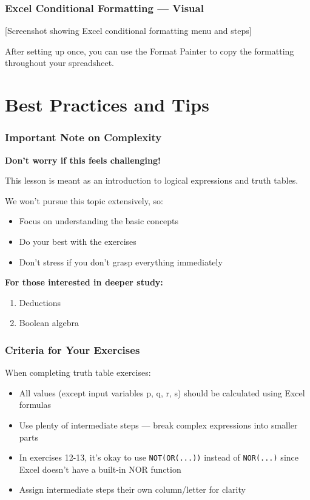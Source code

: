 \documentclass{beamer}
\begin{document}
\begin{frame}
\frametitle{Excel Conditional Formatting --- Visual}
\alert{[Screenshot showing Excel conditional formatting menu and steps]}

\vspace{0.5cm}
After setting up once, you can use the Format Painter to copy the formatting throughout your spreadsheet.
\end{frame}

\section{Best Practices and Tips}

\begin{frame}
\frametitle{Important Note on Complexity}
\textbf{Don't worry if this feels challenging!}\pause

This lesson is meant as an \alert{introduction} to logical expressions and truth tables.\pause

\vspace{0.3cm}
We won't pursue this topic extensively, so:\pause
\begin{itemize}
    \item Focus on understanding the basic concepts\pause
    \item Do your best with the exercises\pause
    \item Don't stress if you don't grasp everything immediately
\end{itemize}\pause

\vspace{0.3cm}
\textbf{For those interested in deeper study:}
\begin{enumerate}
    \item Deductions\pause
    \item Boolean algebra
\end{enumerate}
\end{frame}

\begin{frame}
\frametitle{Criteria for Your Exercises}
When completing truth table exercises:\pause

\begin{itemize}
    \item All values (except input variables p, q, r, s) should be \alert{calculated using Excel formulas}\pause
    \item Use plenty of \alert{intermediate steps} --- break complex expressions into smaller parts\pause
    \item In exercises 12-13, it's okay to use \texttt{NOT(OR(...))} instead of \texttt{NOR(...)} since Excel doesn't have a built-in NOR function\pause
    \item Assign intermediate steps their own column/letter for clarity
\end{itemize}
\end{frame}
\end{document}
